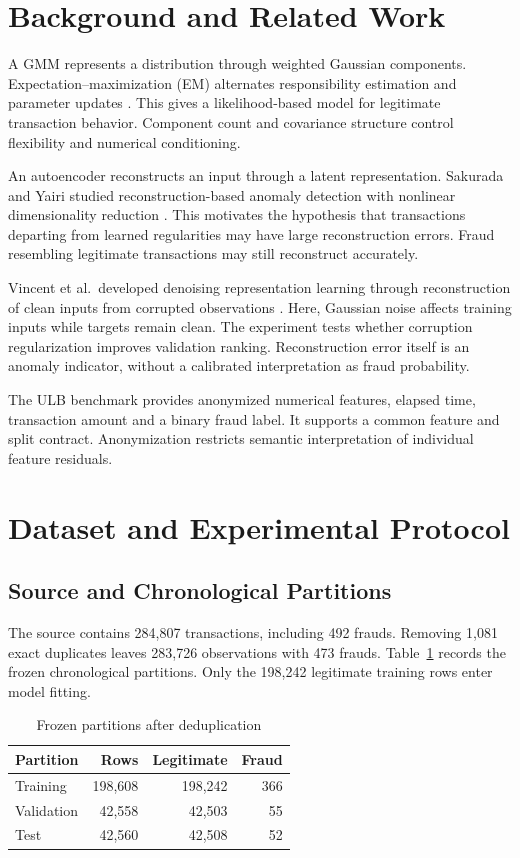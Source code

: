 \documentclass[conference]{IEEEtran}
\begin{document}
\section{Background and Related Work}
A GMM represents a distribution through weighted Gaussian components. Expectation--maximization (EM) alternates responsibility estimation and parameter updates \cite{em}. This gives a likelihood-based model for legitimate transaction behavior. Component count and covariance structure control flexibility and numerical conditioning.

An autoencoder reconstructs an input through a latent representation. Sakurada and Yairi studied reconstruction-based anomaly detection with nonlinear dimensionality reduction \cite{sakurada}. This motivates the hypothesis that transactions departing from learned regularities may have large reconstruction errors. Fraud resembling legitimate transactions may still reconstruct accurately.

Vincent et al.\ developed denoising representation learning through reconstruction of clean inputs from corrupted observations \cite{vincent}. Here, Gaussian noise affects training inputs while targets remain clean. The experiment tests whether corruption regularization improves validation ranking. Reconstruction error itself is an anomaly indicator, without a calibrated interpretation as fraud probability.

The ULB benchmark \cite{dataset} provides anonymized numerical features, elapsed time, transaction amount and a binary fraud label. It supports a common feature and split contract. Anonymization restricts semantic interpretation of individual feature residuals.

\section{Dataset and Experimental Protocol}
\subsection{Source and Chronological Partitions}
The source contains 284,807 transactions, including 492 frauds. Removing 1,081 exact duplicates leaves 283,726 observations with 473 frauds. Table~\ref{tab:splits} records the frozen chronological partitions. Only the 198,242 legitimate training rows enter model fitting.

\begin{table}[!ht]
\caption{Frozen partitions after deduplication}\label{tab:splits}
\centering\small
\begin{tabular}{lrrr}\toprule
Partition & Rows & Legitimate & Fraud\\\midrule
Training & 198,608 & 198,242 & 366\\
Validation & 42,558 & 42,503 & 55\\
Test & 42,560 & 42,508 & 52\\\bottomrule
\end{tabular}
\end{table}
\end{document}
